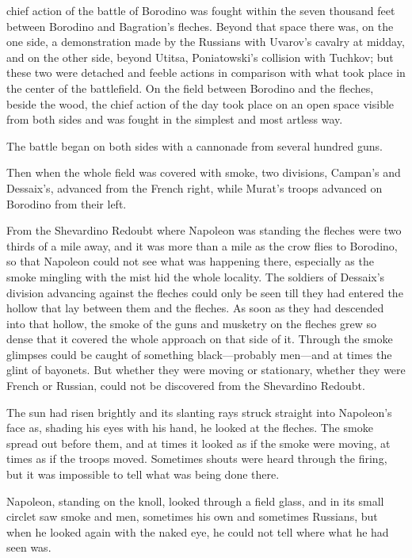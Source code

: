  chief action of the battle of Borodino was fought within the
seven thousand feet between Borodino and Bagration's
fleches. Beyond that space there was, on the one side, a
demonstration made by the Russians with Uvarov's cavalry at
midday, and on the other side, beyond Utitsa, Poniatowski's
collision with Tuchkov; but these two were detached and feeble
actions in comparison with what took place in the center of the
battlefield. On the field between Borodino and the fleches,
beside the wood, the chief action of the day took place on an
open space visible from both sides and was fought in the simplest
and most artless way.

The battle began on both sides with a cannonade from several
hundred guns.

Then when the whole field was covered with smoke, two divisions,
Campan's and Dessaix's, advanced from the French right, while
Murat's troops advanced on Borodino from their left.

From the Shevardino Redoubt where Napoleon was standing the
fleches were two thirds of a mile away, and it was more than a
mile as the crow flies to Borodino, so that Napoleon could not
see what was happening there, especially as the smoke mingling
with the mist hid the whole locality.  The soldiers of Dessaix's
division advancing against the fleches could only be seen till
they had entered the hollow that lay between them and the
fleches. As soon as they had descended into that hollow, the
smoke of the guns and musketry on the fleches grew so dense that
it covered the whole approach on that side of it. Through the
smoke glimpses could be caught of something black---probably
men---and at times the glint of bayonets. But whether they were
moving or stationary, whether they were French or Russian, could
not be discovered from the Shevardino Redoubt.

The sun had risen brightly and its slanting rays struck straight
into Napoleon's face as, shading his eyes with his hand, he
looked at the fleches. The smoke spread out before them, and at
times it looked as if the smoke were moving, at times as if the
troops moved. Sometimes shouts were heard through the firing, but
it was impossible to tell what was being done there.

Napoleon, standing on the knoll, looked through a field glass,
and in its small circlet saw smoke and men, sometimes his own and
sometimes Russians, but when he looked again with the naked eye,
he could not tell where what he had seen was.

